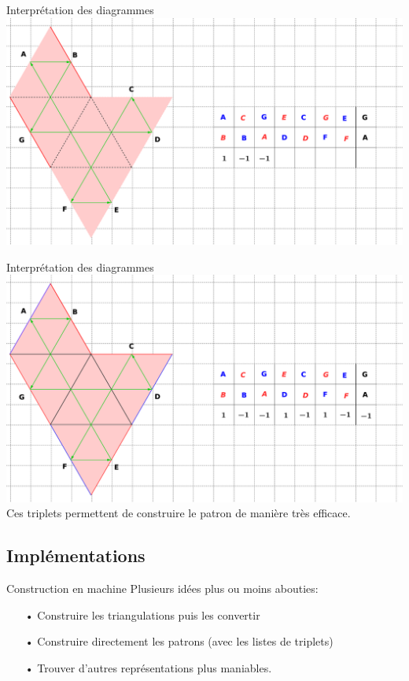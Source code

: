 \documentclass[french,xcolor=dvipsnames]{beamer}
\begin{document}
		\begin{frame}{Interprétation des diagrammes}
			\includegraphics[scale=0.1]{conversion_tuckey_patron_5.eps}
		\end{frame}
		
		\begin{frame}{Interprétation des diagrammes}
			\includegraphics[scale=0.1]{conversion_tuckey_patron_6.eps}\\
			Ces triplets permettent de construire le patron de manière très efficace.
		\end{frame}
		
		\subsection{Implémentations}
		\begin{frame}{Construction en machine}
			Plusieurs idées plus ou moins abouties:\\
			\begin{enumerate}
			\item[•] Construire les triangulations puis les convertir
			\item[•] Construire directement les patrons (avec les listes de triplets)
			\item[•] Trouver d'autres représentations plus maniables.
			\end{enumerate}
		\end{frame}
\end{document}
